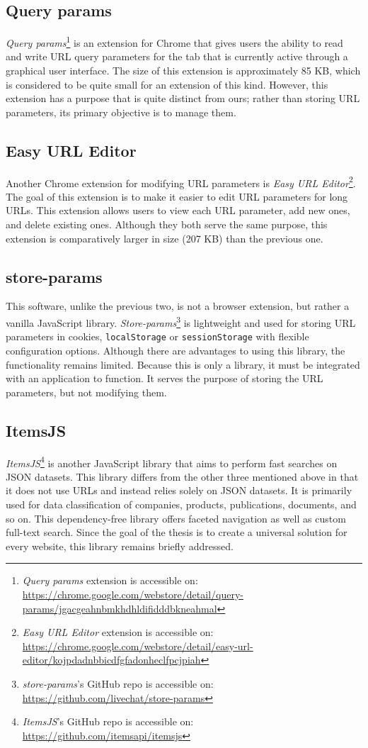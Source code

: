 \subsection*{Query params}
\emph{Query params}\footnote{\emph{Query params} extension is accessible on: \url{https://chrome.google.com/webstore/detail/query-params/jgacgeahnbmkhdhldifidddbkneahmal}} is an extension for Chrome that gives users the ability to read and write URL query parameters for the tab that is currently active through a graphical user interface. The size of this extension is approximately 85 KB, which is considered to be quite small for an extension of this kind. However, this extension has a purpose that is quite distinct from ours; rather than storing URL parameters, its primary objective is to manage them.

\subsection*{Easy URL Editor}
Another Chrome extension for modifying URL parameters is \emph{Easy URL Editor}\footnote{\emph{Easy URL Editor} extension is accessible on: \url{https://chrome.google.com/webstore/detail/easy-url-editor/kojpdadnbbicdfgfadonheclfpcjpiah}}. The goal of this extension is to make it easier to edit URL parameters for long URLs. This extension allows users to view each URL parameter, add new ones, and delete existing ones. Although they both serve the same purpose, this extension is comparatively larger in size (207 KB) than the previous one.

\subsection*{store-params}
This software, unlike the previous two, is not a browser extension, but rather a vanilla JavaScript library. \emph{Store-params}\footnote{\emph{store-params}'s GitHub repo is accessible on: \url{https://github.com/livechat/store-params}} is lightweight and used for storing URL parameters in cookies, \texttt{localStorage} or \texttt{sessionStorage} with flexible configuration options. Although there are advantages to using this library, the functionality remains limited. Because this is only a library, it must be integrated with an application to function. It serves the purpose of storing the URL parameters, but not modifying them.

\subsection*{ItemsJS}
\emph{ItemsJS}\footnote{\emph{ItemsJS}'s GitHub repo is accessible on: \url{https://github.com/itemsapi/itemsjs}} is another JavaScript library that aims to perform fast searches on JSON datasets. This library differs from the other three mentioned above in that it does not use URLs and instead relies solely on JSON datasets. It is primarily used for data classification of companies, products, publications, documents, and so on. This dependency-free library offers faceted navigation as well as custom full-text search. Since the goal of the thesis is to create a universal solution for every website, this library remains briefly addressed.

